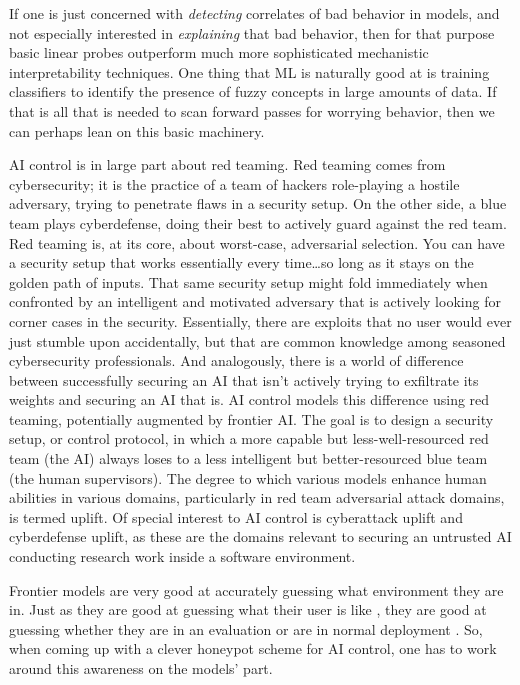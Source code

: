 If one is just concerned with \emph{detecting} correlates of bad behavior in
models, and not especially interested in \emph{explaining} that bad behavior,
then for that purpose basic linear probes outperform much more sophisticated
mechanistic interpretability techniques. One thing that ML is naturally good at
is training classifiers to identify the presence of fuzzy concepts in large
amounts of data. If that is all that is needed to scan forward passes for
worrying behavior, then we can perhaps lean on this basic machinery.

AI control is in large part about red teaming. Red teaming comes from
cybersecurity; it is the practice of a team of hackers role-playing a hostile
adversary, trying to penetrate flaws in a security setup. On the other side, a
blue team plays cyberdefense, doing their best to actively guard against the
red team. Red teaming is, at its core, about worst-case, adversarial selection.
You can have a security setup that works essentially every time\ldots so long
as it stays on the golden path of inputs. That same security setup might fold
immediately when confronted by an intelligent and motivated adversary that is
actively looking for corner cases in the security. Essentially, there are
exploits that no user would ever just stumble upon accidentally, but that are
common knowledge among seasoned cybersecurity professionals. And analogously,
there is a world of difference between successfully securing an AI that isn't
actively trying to exfiltrate its weights and securing an AI that is. AI
control models this difference using red teaming, potentially augmented by
frontier AI. The goal is to design a security setup, or control protocol, in
which a more capable but less-well-resourced red team (the AI) always loses to
a less intelligent but better-resourced blue team (the human supervisors). The
degree to which various models enhance human abilities in various domains,
particularly in red team adversarial attack domains, is termed uplift. Of
special interest to AI control is cyberattack uplift and cyberdefense uplift,
as these are the domains relevant to securing an untrusted AI conducting
research work inside a software environment.

Frontier models are very good at accurately guessing what environment they are
in. Just as they are good at guessing what their user is like
\cite{derner2024truesight}, they are good at guessing whether they are in an
evaluation or are in normal deployment \cite{needham2025know}. So, when coming
up with a clever honeypot scheme for AI control, one has to work around this
awareness on the models' part.

